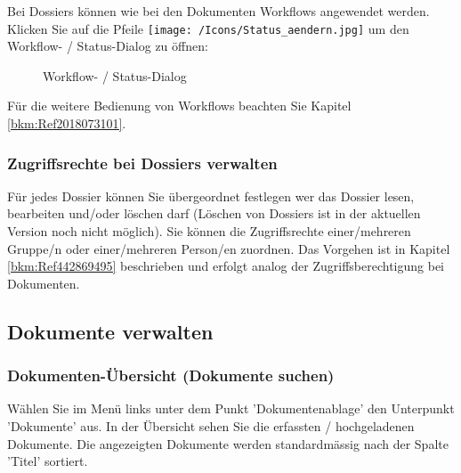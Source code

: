 Bei Dossiers können wie bei den Dokumenten Workflows angewendet werden. Klicken Sie auf die Pfeile \texttt{[image: /Icons/Status\_aendern.jpg]}  um den Workflow- / Status-Dialog zu öffnen:

\vspace{1cm}

\begin{figure}[H]
\caption{Workflow- / Status-Dialog}
\end{figure}

Für die weitere Bedienung von Workflows beachten Sie Kapitel \ref{bkm:Ref2018073101}.

\subsubsection{Zugriffsrechte bei Dossiers verwalten}
\label{bkm:Ref442273510}
Für jedes Dossier können Sie übergeordnet festlegen wer das Dossier lesen, bearbeiten und/oder löschen darf (Löschen von Dossiers ist in der aktuellen Version noch nicht möglich). Sie können die Zugriffsrechte einer/mehreren Gruppe/n oder einer/mehreren Person/en zuordnen. Das Vorgehen ist in Kapitel \ref{bkm:Ref442869495} beschrieben und erfolgt analog der Zugriffsberechtigung bei Dokumenten.

\pagebreak
\subsection{Dokumente verwalten}
\label{bkm:Ref442273482}

\subsubsection{Dokumenten-Übersicht (Dokumente suchen)}
\label{bkm:Ref443047823}

Wählen Sie im Menü links unter dem Punkt 'Dokumentenablage' den Unterpunkt 'Dokumente' aus. In der Übersicht sehen Sie die erfassten / hochgeladenen Dokumente. Die angezeigten Dokumente werden standardmässig nach der Spalte 'Titel' sortiert. 


